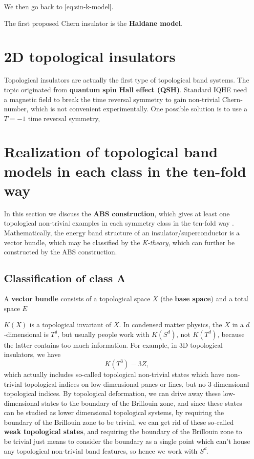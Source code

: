 \documentclass[hyperref, a4paper]{article}
\newcommand*{\concept}[1]{{\textbf{#1}}}
\def\mathbb#1{#1}%
\begin{document}
We then go back to \eqref{eq:sin-k-model}.

The first proposed Chern insulator is the \concept{Haldane model}. 

\section{2D topological insulators}

Topological insulators are actually the first type of topological band systems. The topic originated from 
\concept{quantum spin Hall effect (QSH)}. Standard IQHE need a magnetic field to break the time reversal 
symmetry to gain non-trivial Chern-number, which is not convenient experimentally. One possible solution 
is to use a $T=-1$ time reversal symmetry, 

\section{Realization of topological band models in each class in the ten-fold way}

In this section we discuss the \concept{ABS construction}, which gives at least one topological non-trivial 
examples in each symmetry class in the ten-fold way \cite{stone2010symmetries}. Mathematically, the energy 
band structure of an insulator/superconductor is a vector bundle, which may be classified by the \emph{K-theory},
which can further be constructed by the ABS construction. 

\subsection{Classification of class A}

A \concept{vector bundle} consists of a topological space $X$ (the \concept{base space}) and a total space $E$

$K(X)$ is a topological invariant of $X$. In condensed matter physics, the $X$ in a $d$-dimensional is 
$\mathbb{T}^d$, but usually people work with $K(S^d)$, not $K(\mathbb{T}^d)$, because the latter contains 
too much information. For example, in 3D topological insulators, we have 
\begin{equation}
    K(\mathbb{T}^3) = 3 \mathbb{Z},
\end{equation}
which actually includes so-called topological non-trivial states which have non-trivial topological 
indices on low-dimensional panes or lines, but no 3-dimensional topological indices. By topological
deformation, we can drive away these low-dimensional states to the boundary of the Brillouin zone, 
and since these states can be studied as lower dimensional topological systems, by requiring 
the boundary of the Brillouin zone to be trivial, we can get rid of these so-called 
\concept{weak topological states}, and requiring the boundary of the Brillouin zone to be trivial
just means to consider the boundary as a single point which can't house any topological non-trivial
band features, so hence we work with $S^d$.
\end{document}
